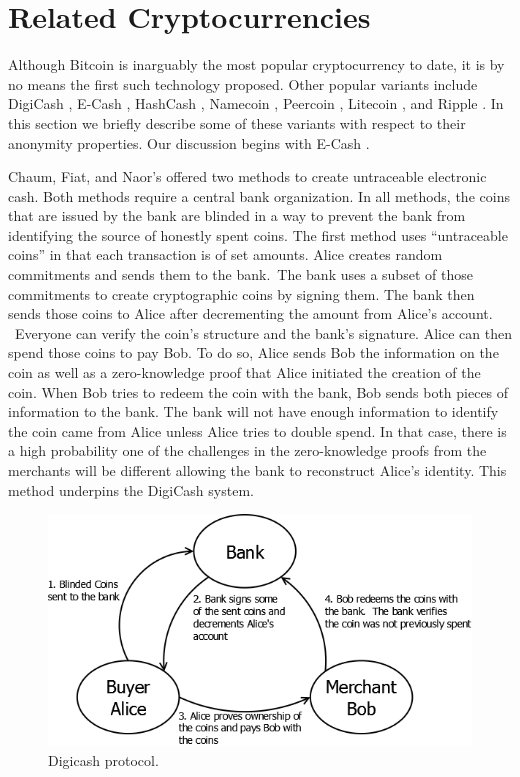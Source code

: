 \section{Related Cryptocurrencies} \label{sec:related}
Although Bitcoin is inarguably the most popular cryptocurrency to date, it is by no means the first such technology proposed. Other popular variants include DigiCash \cite{digicash}, E-Cash \cite{ecash}, HashCash \cite{hashcash}, Namecoin \cite{namecoin}, Peercoin \cite{peercoin}, Litecoin \cite{litecoin}, and Ripple \cite{ripple}. In this section we briefly describe some of these variants with respect to their anonymity properties. Our discussion begins with E-Cash \cite{ecash}.

Chaum, Fiat, and Naor’s offered two methods to create untraceable electronic cash. Both methods require a central bank organization. In all methods, the coins that are issued by the bank are blinded in a way to prevent the bank from identifying the source of honestly spent coins. The first method uses “untraceable coins” in that each transaction is of set amounts. Alice creates random commitments and sends them to the bank. The bank uses a subset of those commitments to create cryptographic coins by signing them. The bank then sends those coins to Alice after decrementing the amount from Alice’s account.  Everyone can verify the coin’s structure and the bank’s signature. Alice can then spend those coins to pay Bob. To do so, Alice sends Bob the information on the coin as well as a zero-knowledge proof that Alice initiated the creation of the coin. When Bob tries to redeem the coin with the bank, Bob sends both pieces of information to the bank. The bank will not have enough information to identify the coin came from Alice unless Alice tries to double spend. In that case, there is a high probability one of the challenges in the zero-knowledge proofs from the merchants will be different allowing the bank to reconstruct Alice’s identity. This method underpins the DigiCash system.

\begin{figure}
\begin{center}
\includegraphics[scale=0.30]{images/digicash.png}
\caption{Digicash protocol.}
\label{fig:tor-end-to-end}
\end{center}
\end{figure}

